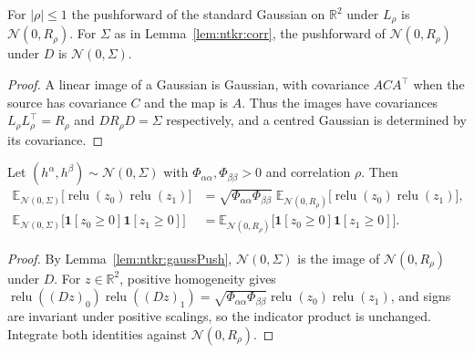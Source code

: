 \begin{lemma}\label{lem:ntkr:gaussPush}
  \leanok
For $|\rho|\le1$ the pushforward of the standard Gaussian on $\mathbb R^2$ under $L_\rho$ is
$\mathcal N(0,R_\rho)$. For $\Sigma$ as in Lemma~\ref{lem:ntkr:corr}, the pushforward of
$\mathcal N(0,R_\rho)$ under $D$ is $\mathcal N(0,\Sigma)$.
\end{lemma}

\begin{proof}
  \leanok
A linear image of a Gaussian is Gaussian, with covariance $ACA^\top$ when the source has covariance
$C$ and the map is $A$. Thus the images have covariances $L_\rho L_\rho^\top=R_\rho$ and $DR_\rho D=\Sigma$
respectively, and a centred Gaussian is determined by its covariance.
\end{proof}

\begin{lemma}\label{lem:ntkr:standardize}
  \leanok
Let $(h^\alpha,h^\beta)\sim\mathcal N(0,\Sigma)$ with $\Phi_{\alpha\alpha},\Phi_{\beta\beta}>0$ and
correlation $\rho$. Then
\begin{align*}
  \mathbb E_{\mathcal N(0,\Sigma)}\bigl[\operatorname{relu}(z_0)\operatorname{relu}(z_1)\bigr]
    &=\sqrt{\Phi_{\alpha\alpha}\Phi_{\beta\beta}}\;\mathbb E_{\mathcal N(0,R_\rho)}\bigl[\operatorname{relu}(z_0)\operatorname{relu}(z_1)\bigr],\\
  \mathbb E_{\mathcal N(0,\Sigma)}\bigl[\mathbf 1[z_0\ge0]\mathbf 1[z_1\ge0]\bigr]
    &=\mathbb E_{\mathcal N(0,R_\rho)}\bigl[\mathbf 1[z_0\ge0]\mathbf 1[z_1\ge0]\bigr].
\end{align*}
\end{lemma}

\begin{proof}
  \leanok
By Lemma~\ref{lem:ntkr:gaussPush}, $\mathcal N(0,\Sigma)$ is the image of $\mathcal N(0,R_\rho)$ under $D$.
For $z\in\mathbb R^2$, positive homogeneity gives
$\operatorname{relu}((Dz)_0)\operatorname{relu}((Dz)_1)=\sqrt{\Phi_{\alpha\alpha}\Phi_{\beta\beta}}\operatorname{relu}(z_0)\operatorname{relu}(z_1)$, and signs are invariant under
positive scalings, so the indicator product is unchanged. Integrate both identities against $\mathcal N(0,R_\rho)$.
\end{proof}

